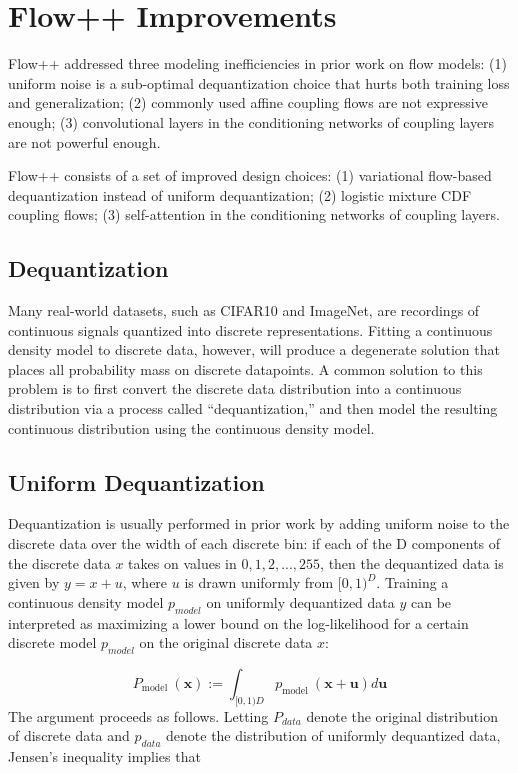 \documentclass[]{IEEEtran}
\begin{document}
\section{Flow++ Improvements}
Flow++ addressed three modeling inefficiencies in prior work on flow models: (1) uniform noise is a sub-optimal dequantization choice that hurts both training loss and generalization; (2) commonly used affine coupling flows are not expressive enough; (3) convolutional layers in the conditioning networks of coupling layers are not powerful enough. \par
Flow++ consists of a set of improved design choices: (1) variational flow-based dequantization instead of uniform dequantization; (2) logistic mixture CDF coupling flows; (3) self-attention in the conditioning networks of coupling layers. 
\subsection{Dequantization}
Many real-world datasets, such as CIFAR10 and ImageNet, are recordings of continuous signals quantized into discrete representations. Fitting a continuous density model to discrete data, however, will produce a degenerate solution that places all probability mass on discrete datapoints. A common solution to this problem is to first convert the discrete data distribution into a continuous distribution via a process called “dequantization,” and then model the resulting continuous distribution using the continuous density model.

\subsection{ Uniform Dequantization }
Dequantization is usually performed in prior work by adding uniform noise to the discrete data over the width of each discrete bin: if each of the D components of the discrete data $x$ takes on values in ${0,1,2,...,255}$, then the dequantized data is given by $y = x+u$, where $u$ is drawn uniformly from $[0,1)^{D}$. Training a continuous density model $p_{model}$ on uniformly dequantized data $y$ can be interpreted as maximizing a lower bound on the log-likelihood for a certain discrete model $p_{model}$ on the original discrete data $x$: 

\begin{equation}
P_{\text {model }}(\mathbf{x}):=\int_{[0,1) D} p_{\text {model }}(\mathbf{x}+\mathbf{u}) d \mathbf{u}
\label{fpp02}
\end{equation}
The argument proceeds as follows. Letting $P_{data}$ denote the original distribution of discrete data and $p_{data}$ denote the distribution of uniformly dequantized data, Jensen’s inequality implies that
\end{document}
